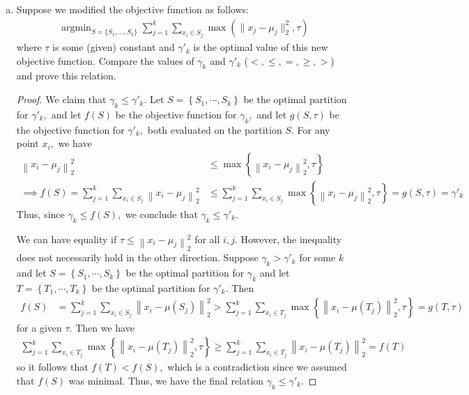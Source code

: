 \documentclass{article}
\begin{document}
\begin{enumerate}[(a)]
		\item Suppose we modified the objective function as follows:
			\begin{eqnarray}
				\mathop{\textrm{argmin}}_{S=\{S_1,...,S_k\}}\sum_{j=1}^k\sum_{x_i\in S_j}\max(\|x_j-\mu_j\|_2^2, \tau)
				\label{objective2}
			\end{eqnarray}
			where $\tau$ is some (given) constant and $\gamma'_k$ is the optimal value of this new objective function. Compare the values of 
			$\gamma_k$ and $\gamma'_k$ ($<, \le, =, \ge, >$) and prove this relation.
			\begin{proof}
				We claim that $\gamma_k \le \gamma'_k.$ Let $S=\left\{ S_1, \cdots, S_k \right\}$ be the optimal partition for $\gamma'_k,$ and let $f(S)$ be the objective function for $\gamma_k,$ and let $g(S, \tau)$ be the objective function for $\gamma'_k,$ both evaluated on the partition $S.$ For any point $x_i,$ we have
				\begin{align*}
					\left\lVert x_i-\mu_j \right\rVert_2^2 &\le \max\left\{ \left\lVert x_i-\mu_j \right\rVert_2^2, \tau \right\} \\
					\implies f(S) = \sum_{j=1}^{k} \sum_{x_i\in S_j}^{} \left\lVert x_i-\mu_j \right\rVert_2^2 &\le \sum_{j=1}^{k} \sum_{x_i\in S_j}^{} \max\left\{ \left\lVert x_i-\mu_j \right\rVert_2^2, \tau \right\} = g(S, \tau) = \gamma'_k
				\end{align*}
				Thus, since $\gamma_k\le f(S),$ we conclude that $\gamma_k\le \gamma'_k.$

				We can have equality if $\tau \le \left\lVert x_i-\mu_j \right\rVert_2^2$ for all $i, j.$ However, the inequality does not necessarily hold in the other direction. Suppose $\gamma_k>\gamma'_k$ for some $k$ and let $S=\left\{ S_1, \cdots, S_k \right\}$ be the optimal partition for $\gamma_k$ and let $T=\left\{ T_1, \cdots, T_k \right\}$ be the optimal partition for $\gamma'_k.$ Then 
				\begin{align*}
					f(S) &= \sum_{j=1}^{k} \sum_{x_i\in S_j}^{}\left\lVert x_i-\mu(S_j) \right\rVert_2^2 > \sum_{j=1}^{k} \sum_{x_i\in T_j}^{}\max\left\{ \left\lVert x_i-\mu(T_j) \right\rVert_2^2, \tau \right\} = g(T, \tau)
				\end{align*}
				for a given $\tau.$ Then we have
				\begin{align*}
					\sum_{j=1}^{k} \sum_{x_i\in T_j}^{}\max\left\{ \left\lVert x_i-\mu(T_j) \right\rVert_2^2, \tau \right\} \ge \sum_{j=1}^{k} \sum_{x_i\in T_j}^{} \left\lVert x_i-\mu(T_j) \right\rVert_2^2 = f(T)
				\end{align*}
				so it follows that $f(T)<f(S),$ which is a contradiction since we assumed that $f(S)$ was minimal. Thus, we have the final relation $\gamma_k\le \gamma'_k.$
			\end{proof}


\end{enumerate}
\end{document}

